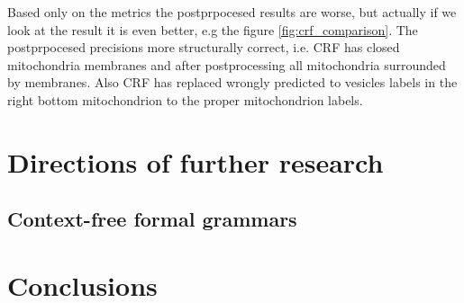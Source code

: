 \documentclass[twocolumn, a4paper]{article}
\theoremstyle{definition}
\begin{document}
Based only on the metrics the postprpocesed results are worse, but actually if we look at the result it is even better,
e.g the figure \ref{fig:crf_comparison}. The postprpocesed precisions more structurally correct, i.e. CRF has closed mitochondria
membranes and after postprocessing all mitochondria surrounded by membranes. Also CRF has replaced wrongly predicted
to vesicles labels in the right bottom mitochondrion to the proper mitochondrion labels.

\section{Directions of further research}
\subsection{Context-free formal grammars}

\section{Conclusions}




\end{document}
